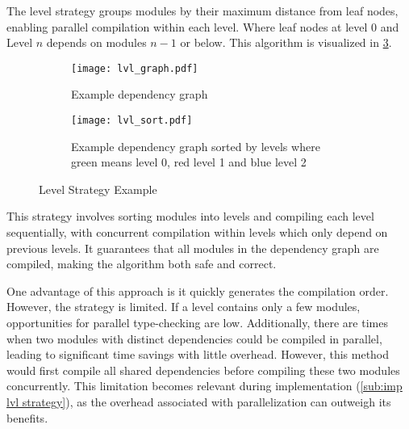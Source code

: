 The level strategy groups modules by their maximum distance from leaf nodes,
enabling parallel compilation within each level. Where leaf nodes at level
\(0\) and Level \(n\) depends on modules \(n - 1\) or below. This algorithm is
visualized in \cref{subfig: lvl strat}.
\begin{figure}[H]
  \begin{subfigure}[t]{0.45\textwidth}
    \centering
    \texttt{[image: lvl\_graph.pdf]}
    \caption{Example dependency graph}
    \label{fig:example lvl dep graph}
  \end{subfigure} \hfill
  \begin{subfigure}[t]{0.45\textwidth}
    \centering
    \texttt{[image: lvl\_sort.pdf]}
    \caption{Example dependency graph sorted by levels where green means level
    0, red level 1 and blue level 2}
    \label{fig:example lvl sort}
  \end{subfigure}
  \caption{Level Strategy Example}
  \label{subfig: lvl strat}
\end{figure}

This strategy involves sorting modules into levels and compiling each level
sequentially, with concurrent compilation within levels which only depend on
previous levels. It guarantees that all modules in the dependency graph are
compiled, making the algorithm both safe and correct.

One advantage of this approach is it quickly generates the compilation order.
However, the strategy is limited. If a level contains only a few modules,
opportunities for parallel type-checking are low. Additionally, there are times
when two modules with distinct dependencies could be compiled in parallel,
leading to significant time savings with little overhead. However, this method
would first compile all shared dependencies before compiling these two modules
concurrently. This limitation becomes relevant during implementation
(\cref{sub:imp lvl strategy}), as the overhead associated with parallelization
can outweigh its benefits.




